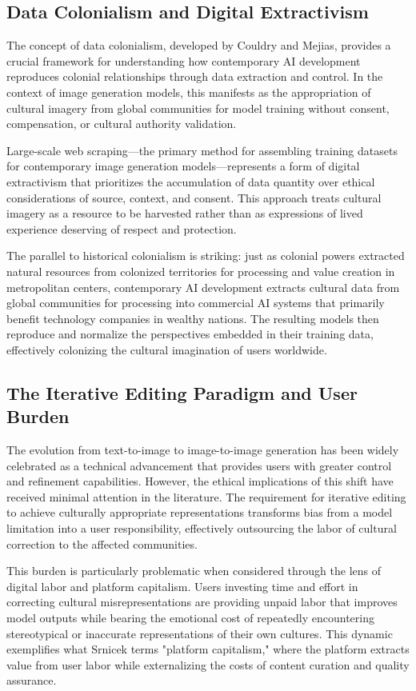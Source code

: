\documentclass{article}
\begin{document}
\subsection{Data Colonialism and Digital Extractivism}

The concept of data colonialism, developed by Couldry and Mejias, provides a crucial framework for understanding how contemporary AI development reproduces colonial relationships through data extraction and control. In the context of image generation models, this manifests as the appropriation of cultural imagery from global communities for model training without consent, compensation, or cultural authority validation.

Large-scale web scraping—the primary method for assembling training datasets for contemporary image generation models—represents a form of digital extractivism that prioritizes the accumulation of data quantity over ethical considerations of source, context, and consent. This approach treats cultural imagery as a resource to be harvested rather than as expressions of lived experience deserving of respect and protection.

The parallel to historical colonialism is striking: just as colonial powers extracted natural resources from colonized territories for processing and value creation in metropolitan centers, contemporary AI development extracts cultural data from global communities for processing into commercial AI systems that primarily benefit technology companies in wealthy nations. The resulting models then reproduce and normalize the perspectives embedded in their training data, effectively colonizing the cultural imagination of users worldwide.

\subsection{The Iterative Editing Paradigm and User Burden}

The evolution from text-to-image to image-to-image generation has been widely celebrated as a technical advancement that provides users with greater control and refinement capabilities. However, the ethical implications of this shift have received minimal attention in the literature. The requirement for iterative editing to achieve culturally appropriate representations transforms bias from a model limitation into a user responsibility, effectively outsourcing the labor of cultural correction to the affected communities.

This burden is particularly problematic when considered through the lens of digital labor and platform capitalism. Users investing time and effort in correcting cultural misrepresentations are providing unpaid labor that improves model outputs while bearing the emotional cost of repeatedly encountering stereotypical or inaccurate representations of their own cultures. This dynamic exemplifies what Srnicek terms "platform capitalism," where the platform extracts value from user labor while externalizing the costs of content curation and quality assurance.
\end{document}
